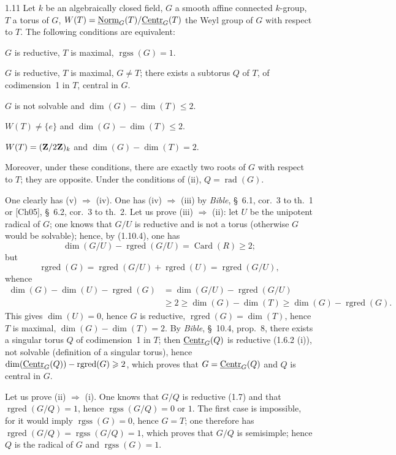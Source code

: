 \begin{lemma}{1.11}\label{XIX.1.11}
Let $k$ be an algebraically closed field, $G$ a smooth affine connected $k$-group, $T$ a torus of $G$, $W(T)=\underline{\mathrm{Norm}}_G(T)/\underline{\mathrm{Centr}}_G(T)$ the Weyl group of $G$ with respect to $T$. The following conditions are equivalent:
\begin{enumeratei}
\item $G$ is reductive, $T$ is maximal, $\operatorname{rgss}(G)=1$.
\item $G$ is reductive, $T$ is maximal, $G\ne T$; there exists a subtorus $Q$ of $T$, of codimension~1 in $T$, central in $G$.
\item $G$ is not solvable and $\dim(G)-\dim(T)\leq2$.
\item $W(T)\ne\{e\}$ and $\dim(G)-\dim(T)\leq2$.
\item $W(T)=(\mathbf{Z}/2\mathbf{Z})_k$ and $\dim(G)-\dim(T)=2$.
\end{enumeratei}
Moreover, under these conditions, there are exactly two roots of $G$ with respect to $T$; they are opposite. Under the conditions of (ii), $Q=\operatorname{rad}(G)$.
\end{lemma}
One clearly has (v) $\Rightarrow$ (iv). One has (iv) $\Rightarrow$ (iii) by \textit{Bible}, \S~6.1, cor.~3 to th.~1 or [Ch05], \S~6.2, cor.~3 to th.~2. Let us prove (iii) $\Rightarrow$ (ii): let $U$ be the unipotent radical of $G$; one knows that $G/U$ is reductive and is not a torus (otherwise $G$ would be solvable); hence, by (1.10.4), one has
\[
\dim(G/U)-\operatorname{rgred}(G/U)=\operatorname{Card}(R)\geq2;
\]
but
\[
\operatorname{rgred}(G)=\operatorname{rgred}(G/U)+\operatorname{rgred}(U)=\operatorname{rgred}(G/U),
\]
whence
\[
\begin{split}
\dim(G)-\dim(U)-\operatorname{rgred}(G)&=\dim(G/U)-\operatorname{rgred}(G/U)\\
&\geq2\geq\dim(G)-\dim(T)\geq\dim(G)-\operatorname{rgred}(G).
\end{split}
\]
This gives $\dim(U)=0$, hence $G$ is reductive, $\operatorname{rgred}(G)=\dim(T)$, hence $T$ is maximal, $\dim(G)-\dim(T)=2$. By \textit{Bible}, \S~10.4, prop.~8, there exists a singular torus $Q$ of codimension~1 in $T$; then $\underline{\mathrm{Centr}}_G(Q)$ is reductive (1.6.2 (i)), not solvable (definition of a singular torus), hence $\dim(\underline{\mathrm{Centr}}_G(Q))-\operatorname{rgred}(G)\geqslant2$, which proves that $G=\underline{\mathrm{Centr}}_G(Q)$ and $Q$ is central in $G$.

Let us prove (ii) $\Rightarrow$ (i). One knows that $G/Q$ is reductive (1.7) and that $\operatorname{rgred}(G/Q)=1$, hence $\operatorname{rgss}(G/Q)=0$ or $1$. The first case is impossible, for it would imply $\operatorname{rgss}(G)=0$, hence $G=T$; one therefore has $\operatorname{rgred}(G/Q)=\operatorname{rgss}(G/Q)=1$, which proves that $G/Q$ is semisimple; hence $Q$ is the radical of $G$ and $\operatorname{rgss}(G)=1$.
